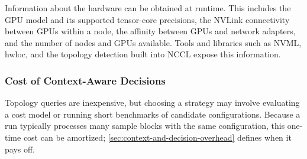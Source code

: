 Information about the hardware can be obtained at runtime. This includes the GPU model and its supported tensor-core precisions, the NVLink connectivity between GPUs within a node, the affinity between GPUs and network adapters, and the number of nodes and GPUs available. Tools and libraries such as NVML, hwloc, and the topology detection built into NCCL expose this information.

\subsubsection{Cost of Context-Aware Decisions}
\label{sec:cost-of-context-aware-decisions}

Topology queries are inexpensive, but choosing a strategy may involve evaluating a cost model or running short benchmarks of candidate configurations. Because a run typically processes many sample blocks with the same configuration, this one-time cost can be amortized; \cref{sec:context-and-decision-overhead} defines when it pays off.
